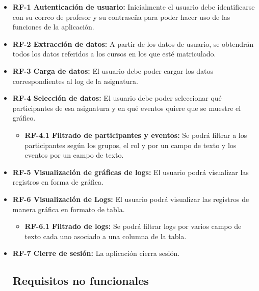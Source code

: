 \begin{itemize}
	\tightlist
	\item
	\textbf{RF-1 Autenticación de usuario:} Inicialmente el usuario debe identificarse con su correo de profesor y su contraseña para poder hacer uso de las funciones de la aplicación.
	\item
	\textbf{RF-2 Extracción de datos:} A partir de los datos de usuario, se obtendrán todos los datos referidos a los cursos en los que esté matriculado.
	\item
	\textbf{RF-3 Carga de datos:} El usuario debe poder cargar los datos correspondientes al log de la asignatura.
	\item
	\textbf{RF-4 Selección de datos:} El usuario debe poder seleccionar qué participantes de esa asignatura y en qué eventos quiere que se muestre el gráfico.
	
	\begin{itemize}
		\tightlist
		\item
		\textbf{RF-4.1 Filtrado de participantes y eventos:} Se podrá filtrar a los participantes según los grupos, el rol y por un campo de texto y los eventos por un campo de texto.
	\end{itemize}
	\item
	\textbf{RF-5 Visualización de gráficas de logs:} El usuario podrá visualizar las registros en forma de gráfica.
	\item
	\textbf{RF-6 Visualización de Logs:} El usuario podrá visualizar las registros de manera gráfica en formato de tabla.
		\begin{itemize}
			\tightlist
			\item
			\textbf{RF-6.1 Filtrado de logs:} Se podrá filtrar logs por varios campo de texto cada uno asociado a una columna de la tabla.
		\end{itemize}
	\item
	\textbf{RF-7 Cierre de sesión:} La aplicación cierra sesión.

\subsection{Requisitos no funcionales}\label{requisitos-no-funcionales}


\end{itemize}
